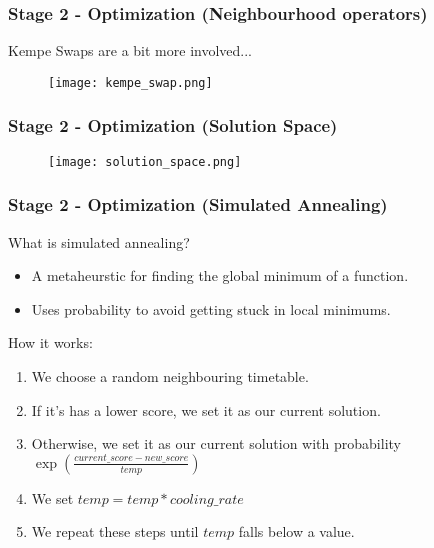 \documentclass{beamer}
\begin{document}
\begin{frame}
	\frametitle{Stage 2 - Optimization (Neighbourhood operators)}
	
	Kempe Swaps are a bit more involved...
	
		\begin{figure}[H]
		\centering
		\texttt{[image: kempe\_swap.png]}
	\end{figure}

\end{frame}

\begin{frame}
	\frametitle{Stage 2 - Optimization (Solution Space)}
	
	\begin{figure}[H]
		\centering
		\texttt{[image: solution\_space.png]}
	\end{figure}
	
\end{frame}

\begin{frame}
	\frametitle{Stage 2 - Optimization (Simulated Annealing)}
	
	What is simulated annealing?
	\begin{itemize}
		\item A metaheurstic for finding the global minimum of a function.
		\item Uses probability to avoid getting stuck in local minimums.
	\end{itemize}

	How it works:
	
	\begin{enumerate}
		
		\item We choose a random neighbouring timetable.
		\item If it's has a lower score, we set it as our current solution.
		\item Otherwise, we set it as our current solution with probability $\exp(\frac{current\_score - new\_score}{temp})$
		\item We set $temp = temp * cooling\_rate$
		\item We repeat these steps until $temp$ falls below a  value.
	\end{enumerate}
	
\end{frame}
\end{document}
